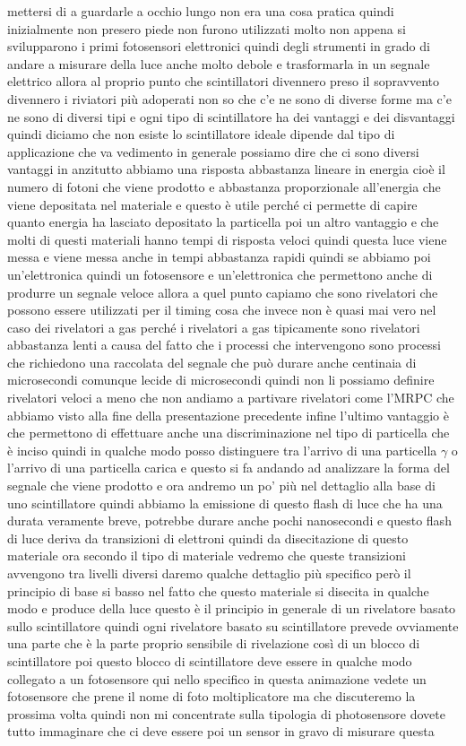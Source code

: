 mettersi di a guardarle a occhio lungo non era una cosa pratica quindi inizialmente non presero piede non furono utilizzati molto non appena si svilupparono i primi fotosensori elettronici quindi degli strumenti in grado di andare a misurare della luce anche molto debole e trasformarla in un segnale elettrico allora al proprio punto che scintillatori divennero preso il sopravvento divennero i riviatori più adoperati non so che c'e ne sono di diverse forme ma c'e ne sono di diversi tipi e ogni tipo di scintillatore ha dei vantaggi e dei disvantaggi quindi diciamo che non esiste lo scintillatore ideale dipende dal tipo di applicazione che va vedimento in generale possiamo dire che ci sono diversi vantaggi in anzitutto abbiamo una risposta abbastanza lineare in energia cioè il numero di fotoni che viene prodotto e abbastanza proporzionale all'energia che viene depositata nel materiale e questo è utile perché ci permette di capire quanto energia ha lasciato depositato la particella poi un altro vantaggio e che molti di questi materiali hanno tempi di risposta veloci quindi questa luce viene messa e viene messa anche in tempi abbastanza rapidi quindi se abbiamo poi un'elettronica quindi un fotosensore e un'elettronica che permettono anche di produrre un segnale veloce allora a quel punto capiamo che sono rivelatori che possono essere utilizzati per il timing cosa che invece non è quasi mai vero nel caso dei rivelatori a gas perché i rivelatori a gas tipicamente sono rivelatori abbastanza lenti a causa del fatto che i processi che intervengono sono processi che richiedono una raccolata del segnale che può durare anche centinaia di microsecondi comunque lecide di microsecondi quindi non li possiamo definire rivelatori veloci a meno che non andiamo a partivare rivelatori come l'MRPC che abbiamo visto alla fine della presentazione precedente infine l'ultimo vantaggio è che permettono di effettuare anche una discriminazione nel tipo di particella che è inciso quindi in qualche modo posso distinguere tra l'arrivo di una particella $\gamma$ o l'arrivo di una particella carica e questo si fa andando ad analizzare la forma del segnale che viene prodotto e ora andremo un po' più nel dettaglio alla base di uno scintillatore quindi abbiamo la emissione di questo flash di luce che ha una durata veramente breve, potrebbe durare anche pochi nanosecondi e questo flash di luce deriva da transizioni di elettroni quindi da disecitazione di questo materiale ora secondo il tipo di materiale vedremo che queste transizioni avvengono tra livelli diversi daremo qualche dettaglio più specifico però il principio di base si basso nel fatto che questo materiale si disecita in qualche modo e produce della luce questo è il principio in generale di un rivelatore basato sullo scintillatore quindi ogni rivelatore basato su scintillatore prevede ovviamente una parte che è la parte proprio sensibile di rivelazione così di un blocco di scintillatore poi questo blocco di scintillatore deve essere in qualche modo collegato a un fotosensore qui nello specifico in questa animazione vedete un fotosensore che prene il nome di foto moltiplicatore ma che discuteremo la prossima volta quindi non mi concentrate sulla tipologia di photosensore dovete tutto immaginare che ci deve essere poi un sensor in gravo di misurare questa 